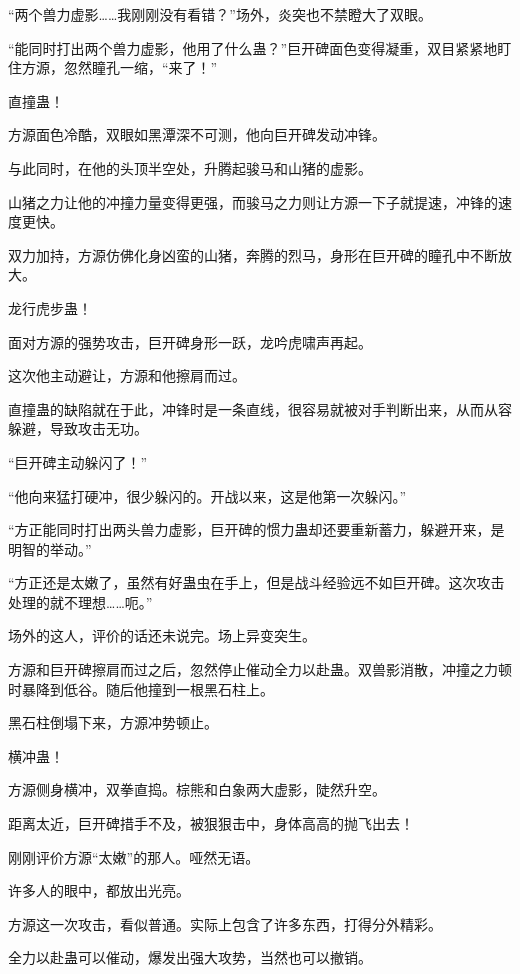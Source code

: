 
\begin{this_body}

“两个兽力虚影……我刚刚没有看错？”场外，炎突也不禁瞪大了双眼。

“能同时打出两个兽力虚影，他用了什么蛊？”巨开碑面色变得凝重，双目紧紧地盯住方源，忽然瞳孔一缩，“来了！”

直撞蛊！

方源面色冷酷，双眼如黑潭深不可测，他向巨开碑发动冲锋。

与此同时，在他的头顶半空处，升腾起骏马和山猪的虚影。

山猪之力让他的冲撞力量变得更强，而骏马之力则让方源一下子就提速，冲锋的速度更快。

双力加持，方源仿佛化身凶蛮的山猪，奔腾的烈马，身形在巨开碑的瞳孔中不断放大。

龙行虎步蛊！

面对方源的强势攻击，巨开碑身形一跃，龙吟虎啸声再起。

这次他主动避让，方源和他擦肩而过。

直撞蛊的缺陷就在于此，冲锋时是一条直线，很容易就被对手判断出来，从而从容躲避，导致攻击无功。

“巨开碑主动躲闪了！”

“他向来猛打硬冲，很少躲闪的。开战以来，这是他第一次躲闪。”

“方正能同时打出两头兽力虚影，巨开碑的惯力蛊却还要重新蓄力，躲避开来，是明智的举动。”

“方正还是太嫩了，虽然有好蛊虫在手上，但是战斗经验远不如巨开碑。这次攻击处理的就不理想……呃。”

场外的这人，评价的话还未说完。场上异变突生。

方源和巨开碑擦肩而过之后，忽然停止催动全力以赴蛊。双兽影消散，冲撞之力顿时暴降到低谷。随后他撞到一根黑石柱上。

黑石柱倒塌下来，方源冲势顿止。

横冲蛊！

方源侧身横冲，双拳直捣。棕熊和白象两大虚影，陡然升空。

距离太近，巨开碑措手不及，被狠狠击中，身体高高的抛飞出去！

刚刚评价方源“太嫩”的那人。哑然无语。

许多人的眼中，都放出光亮。

方源这一次攻击，看似普通。实际上包含了许多东西，打得分外精彩。

全力以赴蛊可以催动，爆发出强大攻势，当然也可以撤销。


\end{this_body}
